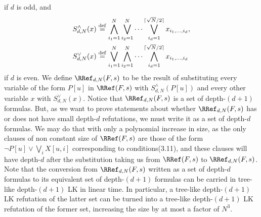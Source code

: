 if $d$ is odd, and
\begin{align*}
S_{d,N}^{\wedge}(x)&\stackrel{\rm def}=\bigwedge_{i_1=1}^N\bigvee_{i_2=1}^N\cdots\bigvee_{i_d=1}^{\lceil\sqrt N/2\rceil}x_{i_1,\ldots,i_d},\\
S_{d,N}^{\vee}(x)&\stackrel{\rm def}=\bigvee_{i_1=1}^N\bigwedge_{i_2=1}^N\cdots\bigwedge_{i_d=1}^{\lceil\sqrt N/2\rceil}x_{i_1,\ldots,i_d}
\end{align*}
if $d$ is even.
We define $\RRef_{d,N}(F,s)$ to be the result of substituting every variable of the form $P[u]$ in $\RRef(F,s)$ with $S_{d,N}^{\wedge}(P[u])$ and every other variable $x$ with $S_{d,N}^{\vee}(x)$. Notice that $\RRef_{d,N}(F,s)$ is a set of depth-$(d+1)$ formulas. But, as we want to prove statements about whether $\RRef_{d,N}(F,s)$ has or does not have small depth-$d$ refutations, we must write it as a set of depth-$d$ formulas. We may do that with only a polynomial increase in size, as the only clauses of non constant size of $\RRef(F,s)$ are those of the form $\neg P[u]\vee\bigvee_i X[u,i]$ corresponding to conditions(3.11), and these clauses will have depth-$d$ after the substitution taking us from $\RRef(F,s)$ to $\RRef_{d,N}(F,s)$. Note that the conversion from $\RRef_{d,N}(F,s)$ written as a set of depth-$d$ formulas to its equivalent set of depth-$(d+1)$ formulas can be carried in tree-like depth-$(d+1)$ LK in linear time. In particular, a tree-like depth-$(d+1)$ LK refutation of the latter set can be turned into a tree-like depth-$(d+1)$ LK refutation of the former set, increasing the size by at most a factor of $N^3$.
